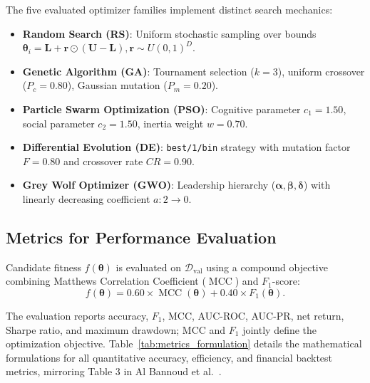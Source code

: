The five evaluated optimizer families implement distinct search mechanics:
\begin{itemize}
    \item \textbf{Random Search (RS)}: Uniform stochastic sampling over bounds $\bm{\theta}_i = \bm{L} + \bm{r} \odot (\bm{U} - \bm{L}), \bm{r} \sim U(0,1)^D$.
    \item \textbf{Genetic Algorithm (GA)}: Tournament selection ($k=3$), uniform crossover ($P_c = 0.80$), Gaussian mutation ($P_m = 0.20$).
    \item \textbf{Particle Swarm Optimization (PSO)}: Cognitive parameter $c_1 = 1.50$, social parameter $c_2 = 1.50$, inertia weight $w = 0.70$.
    \item \textbf{Differential Evolution (DE)}: \texttt{best/1/bin} strategy with mutation factor $F = 0.80$ and crossover rate $CR = 0.90$.
    \item \textbf{Grey Wolf Optimizer (GWO)}: Leadership hierarchy ($\bm{\alpha}, \bm{\beta}, \bm{\delta}$) with linearly decreasing coefficient $a: 2 \to 0$.
\end{itemize}

\subsection{Metrics for Performance Evaluation}\label{sec:metrics}

Candidate fitness $f(\bm{\theta})$ is evaluated on $\mathcal{D}_{\text{val}}$ using a compound objective combining Matthews Correlation Coefficient ($\operatorname{MCC}$) and $F_1$-score:
\begin{equation}\label{eq:fitness}
    f(\bm{\theta}) = 0.60 \times \operatorname{MCC}(\bm{\theta}) + 0.40 \times F_1(\bm{\theta}).
\end{equation}

\ifdefined\methodresultscompact
The evaluation reports accuracy, $F_1$, MCC, AUC-ROC, AUC-PR, net return, Sharpe ratio, and maximum drawdown; MCC and $F_1$ jointly define the optimization objective.
\else
Table~\ref{tab:metrics_formulation} details the mathematical formulations for all quantitative accuracy, efficiency, and financial backtest metrics, mirroring Table 3 in Al Bannoud et al.\ \cite{al_bannoud2026accelerating}.
\fi

